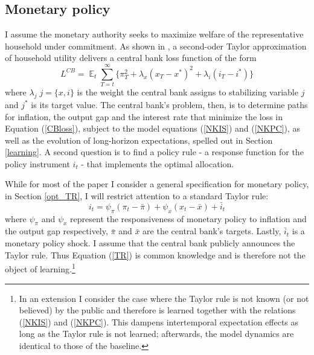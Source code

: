 \documentclass[11pt]{article}
\renewcommand{\[}{\begin{equation}}
\renewcommand{\]}{\end{equation}}
\DeclareMathOperator{\E}{\mathbb{E}}
\begin{document}
\subsection{Monetary policy}\label{monpol}
I assume the monetary authority seeks to maximize welfare of the representative household under commitment. As shown in \cite{woodford2011interest}, a second-oder Taylor approximation of household utility delivers a central bank loss function of the form
\begin{equation}
L^{CB} =\E_t \sum_{T=t}^{\infty}\{\pi_T^2 +\lambda_x(x_T - x^*)^2 +\lambda_i(i_T - i^*)\} \label{CBloss}
\end{equation}
where $\lambda_j \; j=\{x,i\}$ is the weight the central bank assigns to stabilizing variable $j$ and $j^*$ is its target value. The central bank's problem, then, is to determine paths for inflation, the output gap and the interest rate that minimize the loss in Equation (\ref{CBloss}), subject to the model equations (\ref{NKIS}) and (\ref{NKPC}), as well as the evolution of long-horizon expectations, spelled out in Section \ref{learning}. A second question is to find a policy rule - a response function for the policy instrument $i_t$ - that implements the optimal allocation.

While for most of the paper I consider a general specification for monetary policy, in Section \ref{opt_TR}, I will restrict attention to a standard Taylor rule:
\begin{equation}
i_t = \psi_{\pi}(\pi_t -\bar{\pi}) + \psi_{x} (x_t -\bar{x}) + \bar{i}_t  \label{TR}
\end{equation}
where $\psi_{\pi}$ and $\psi_{x}$ represent the responsiveness of monetary policy to inflation and the output gap respectively, $\bar{\pi}$ and $\bar{x}$ are the central bank's targets. Lastly, $\bar{i}_t$ is a monetary policy shock. I assume that the central bank publicly announces the Taylor rule. Thus Equation (\ref{TR}) is common knowledge and is therefore not the object of learning.\footnote{In an extension I consider the case where the Taylor rule is not known (or not believed) by the public and therefore is learned together with the relations (\ref{NKIS}) and (\ref{NKPC}). This dampens intertemporal expectation effects as long as the Taylor rule is not learned; afterwards, the model dynamics are identical to those of the baseline.} 

\end{document}
